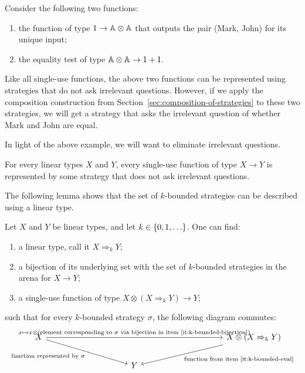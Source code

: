\begin{example}
    Consider the  following two functions: 
    \begin{enumerate}
        \item the function of type  $1 \to \mathbb A \otimes \mathbb A$ that outputs the pair (Mark, John) for its unique input;
        \item the equality test of type $\mathbb A \otimes \mathbb A \to 1 + 1$.
    \end{enumerate}
    Like all single-use functions, the above two functions can be represented using strategies that do not ask irrelevant questions. However, if we apply the composition construction from Section~\ref{sec:composition-of-strategies} to these two strategies, we will get a strategy that asks the irrelevant question of whether Mark and John are equal. \exampleend
\end{example}

In light of the above example, we will want to eliminate irrelevant questions. 

\begin{lemma}\label{lem:eliminate-irrelevant-questions}
    For every linear types $X$ and $Y$, every single-use function of type  $X \to Y$ is represented by  some strategy that does not ask irrelevant questions.
\end{lemma}


The following lemma shows that the set of $k$-bounded strategies can be described using a linear type.

\begin{lemma}\label{lem:linear-type-of-k-bounded-strategies}
    Let $X$ and $Y$ be linear types, and let $k \in \{0,1,\ldots\}$. One can find: 
    \begin{enumerate}
        \item \label{it:k-bounded-type} a linear type, call it $X \Rightarrow_k Y$;
        \item \label{it:k-bounded-bijection} a bijection of its underlying set with the set of $k$-bounded strategies in the arena for $X \to Y$;
        \item \label{it:k-bounded-eval} a single-use function of type $X \otimes (X \Rightarrow_k Y) \to Y$;\end{enumerate}
    such that for every $k$-bounded strategy $\sigma$, the following diagram commutes:
    \[
    \begin{tikzcd}[column sep=3.5cm]
    X  
    \ar[rr,"{x \mapsto x \otimes \text{(element corresponding to $\sigma$ via bijection in item~\ref{it:k-bounded-bijection}})}"]
    \ar[dr,"{\text{function represented by $\sigma$}}"']
    & & 
    X \otimes (X \Rightarrow_k Y)
    \ar[dl,"\text{function from item~\ref{it:k-bounded-eval}}"]
    \\
    & Y
    \end{tikzcd}
    \]    
\end{lemma}




